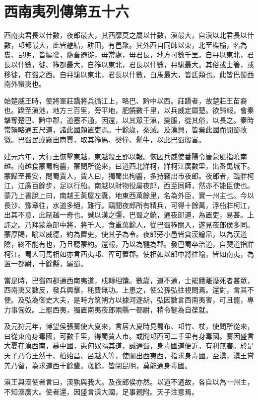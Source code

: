 \chapter{西南夷列傳第五十六}

西南夷君長以什數，夜郎最大，其西靡莫之屬以什數，滇最大，自滇以北君長以什數，邛都最大，此皆魋結，耕田，有邑聚。其外西自同師以東，北至楪榆，名為巂、昆明，皆編發，隨畜遷徙，毋常處，毋君長，地方可數千里。自冄以東北，君長以什數，徙、筰都最大，自筰以東北，君長以什數，冄駹最大。其俗或士箸，或移徙，在蜀之西。自冄駹以東北，君長以什數，白馬最大，皆氐類也。此皆巴蜀西南外蠻夷也。

始楚威王時，使將軍莊蹻將兵循江上，略巴、黔中以西。莊蹻者，故楚莊王苗裔也。蹻至滇池，地方三百里，旁平地，肥饒數千里，以兵威定屬楚。欲歸報，會秦擊奪楚巴、黔中郡，道塞不通，因還，以其眾王滇，變服，從其俗，以長之。秦時常頞略通五尺道，諸此國頗置吏焉。十餘歲，秦滅。及漢興，皆棄此國而開蜀故徼。巴蜀民或竊出商賈，取其筰馬、僰僮、髦牛，以此巴蜀殷富。

建元六年，大行王恢擊東越，東越殺王郢以報。恢因兵威使番陽令唐蒙風指曉南越。南越食蒙蜀枸醬，蒙問所從來，曰道西北牂柯，牂柯江廣數里，出番禺城下。蒙歸至長安，問蜀賈人，賈人曰，獨蜀出枸醬，多持竊出市夜郎。夜郎者，臨牂柯江，江廣百餘步，足以行船。南越以財物役屬夜郎，西至同師，然亦不能臣使也。蒙乃上書說上曰，南越王黃屋左纛，地東西萬餘里，名為外臣，實一州主也。今以長沙、豫章往，水道多絕，難行。竊聞夜郎所有精兵，可得十餘萬，浮船牂柯江，出其不意，此制越一奇也。誠以漢之彊，巴蜀之饒，通夜郎道，為置吏，易甚。上許之。乃拜蒙為郎中將，將千人，食重萬餘人，從巴蜀筰關入，遂見夜郎侯多同。蒙厚賜，喻以威德，約為置吏，使其子為令。夜郎旁小邑皆貪漢繒帛，以為漢道險，終不能有也，乃且聽蒙約。還報，乃以為犍為郡。發巴蜀卒治道，自僰道指牂柯江。蜀人司馬相如亦言西夷邛、筰可置郡。使相如以郎中將往喻，皆如南夷，為置一都尉，十餘縣，屬蜀。

當是時，巴蜀四郡通西南夷道，戍轉相馕。數歲，道不通，士罷餓離溼死者甚眾，西南夷又數反，發兵興擊，秏費無功。上患之，使公孫弘往視問焉。還對，言其不便。及弘為御史大夫，是時方筑朔方以據河逐胡，弘因數言西南夷害，可且罷，專力事匈奴。上罷西夷，獨置南夷夜郎兩縣一都尉，稍令犍為自葆就。

及元狩元年，博望侯張騫使大夏來，言居大夏時見蜀布、邛竹、杖，使問所從來，曰從東南身毒國，可數千里，得蜀賈人市。或聞邛西可二千里有身毒國。騫因盛言大夏在漢西南，慕中國，患匈奴隔其道，誠通蜀，身毒國道便近，有利無害。於是天子乃令王然于、柏始昌、呂越人等，使閒出西夷西，指求身毒國。至滇，滇王嘗羌乃留，為求道西十餘輩。歲餘，皆閉昆明，莫能通身毒國。

滇王與漢使者言曰，漢孰與我大。及夜郎侯亦然。以道不通故，各自以為一州主，不知漢廣大。使者還，因盛言滇大國，足事親附。天子注意焉。

